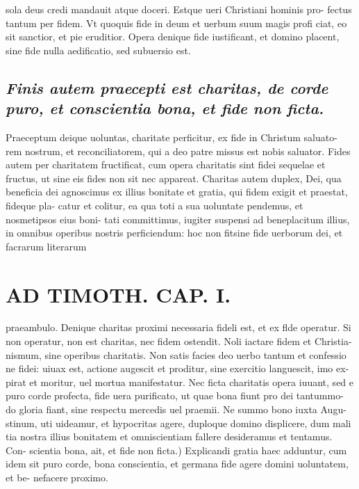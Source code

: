 \documentclass{article}
\begin{document}
\begin{pages}
sola deus credi mandauit atque doceri. Estque ueri Christiani hominis pro- fectus tantum per fidem. Vt quoquis fide in deum et uerbum suum magis profi ciat, eo sit sanctior, et pie eruditior. Opera denique fide iustificant, et domino placent, sine fide nulla aedificatio, sed subuersio est.  \pend
{}
{}
\subsection*{\textit{Finis autem praecepti est charitas, de corde puro, et conscientia bona, et fide non ficta. }}\pstart Praeceptum deique uoluntas, charitate perficitur, ex fide in Christum saluato- rem nostrum, et reconciliatorem, qui a deo patre missus est nobis saluator. Fides autem per charitatem fructificat, cum opera charitatis sint fidei sequelae et fructus, ut sine eis fides non sit nec appareat. Charitas autem duplex, Dei, qua beneficia dei agnoscimus ex illius bonitate et gratia, qui fidem exigit et praestat, fideque pla- catur et colitur, ea qua toti a sua uoluntate pendemus, et nosmetipsos eius boni- tati committimus, iugiter suspensi ad beneplacitum illius, in omnibus operibus nostris perficiendum: hoc non fitsine fide uerborum dei, et facrarum literarum  \pend
\section*{AD TIMOTH. CAP. I. }
\marginpar{[ p.469 ]}\pstart praeambulo. Denique charitas proximi necessaria fideli est, et ex flde operatur. Si non operatur, non est charitas, nec fidem ostendit. Noli iactare fidem et Christia- nismum, sine operibus charitatis. Non satis facies deo uerbo tantum et confessio ne fidei: uiuax est, actione augescit et proditur, sine exercitio languescit, imo ex- pirat et moritur, uel mortua manifestatur. Nec ficta charitatis opera iuuant, sed e puro corde profecta, fide uera purificato, ut quae bona fiunt pro dei tantummo- do gloria fiant, sine respectu mercedis uel praemii. Ne summo bono iuxta Augu- stinum, uti uideamur, et hypocritas agere, duploque domino displicere, dum mali tia nostra illius bonitatem et omniscientiam fallere desideramus et tentamus. Con- scientia bona, ait, et fide non ficta.) Explicandi gratia haec adduntur, cum idem sit puro corde, bona conscientia, et germana fide agere domini uoluntatem, et be- nefacere proximo.  \pend
{}
{}

\end{pages}
\end{document}
